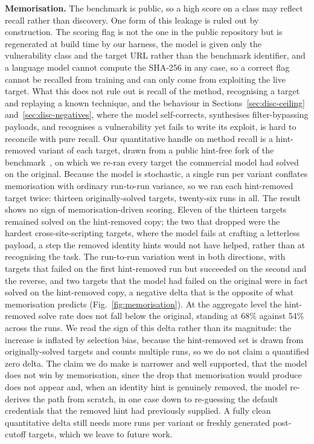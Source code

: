 \documentclass[conference]{IEEEtran}
\begin{document}
\textbf{Memorisation.}
The benchmark is public, so a high score on a class may reflect recall rather than discovery. One form of this leakage is ruled out by construction. The scoring flag is not the one in the public repository but is regenerated at build time by our harness, the model is given only the vulnerability class and the target URL rather than the benchmark identifier, and a language model cannot compute the SHA-256 in any case, so a correct flag cannot be recalled from training and can only come from exploiting the live target. What this does not rule out is recall of the method, recognising a target and replaying a known technique, and the behaviour in Sections~\ref{sec:disc-ceiling} and~\ref{sec:disc-negatives}, where the model self-corrects, synthesises filter-bypassing payloads, and recognises a vulnerability yet fails to write its exploit, is hard to reconcile with pure recall. Our quantitative handle on method recall is a hint-removed variant of each target, drawn from a public hint-free fork of the benchmark~\cite{keygraph2025}, on which we re-ran every target the commercial model had solved on the original. Because the model is stochastic, a single run per variant conflates memorisation with ordinary run-to-run variance, so we ran each hint-removed target twice: thirteen originally-solved targets, twenty-six runs in all. The result shows no sign of memorisation-driven scoring. Eleven of the thirteen targets remained solved on the hint-removed copy; the two that dropped were the hardest cross-site-scripting targets, where the model fails at crafting a letterless payload, a step the removed identity hints would not have helped, rather than at recognising the task. The run-to-run variation went in both directions, with targets that failed on the first hint-removed run but succeeded on the second and the reverse, and two targets that the model had failed on the original were in fact solved on the hint-removed copy, a negative delta that is the opposite of what memorisation predicts (Fig.~\ref{fig:memorisation}). At the aggregate level the hint-removed solve rate does not fall below the original, standing at 68\% against 54\% across the runs. We read the sign of this delta rather than its magnitude: the increase is inflated by selection bias, because the hint-removed set is drawn from originally-solved targets and counts multiple runs, so we do not claim a quantified zero delta. The claim we do make is narrower and well supported, that the model does not win by memorisation, since the drop that memorisation would produce does not appear and, when an identity hint is genuinely removed, the model re-derives the path from scratch, in one case down to re-guessing the default credentials that the removed hint had previously supplied. A fully clean quantitative delta still needs more runs per variant or freshly generated post-cutoff targets, which we leave to future work.
\end{document}

